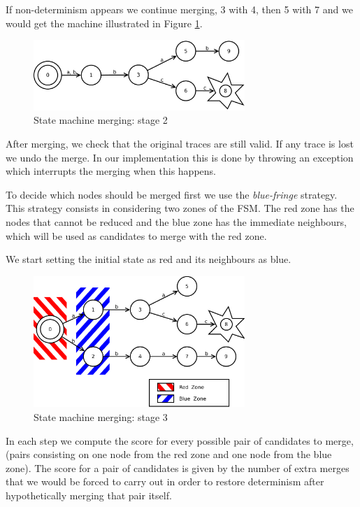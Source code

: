 \documentclass[]{sigplanconf}
\begin{document}
If non-determinism appears we continue merging, 3 with 4, then
5 with 7 and we would get the machine illustrated in Figure \ref{fsm3}.

\begin{figure}
\begin{center}
\includegraphics[width=8cm]{pictures/fsm3.pdf}
\end{center}
\caption{State machine merging: stage 2}
\label{fsm3}
\end{figure}

After merging, we check that the original traces are still
valid. If any trace is lost we undo the merge. In our implementation
this is done by throwing an exception which interrupts the merging
when this happens.

To decide which nodes should be merged first we use the \emph{
blue-fringe} strategy. This strategy consists in considering two zones of the
FSM. The red zone has the nodes that cannot be reduced
and the blue zone has the immediate neighbours, which will
be used as candidates to merge with the red zone.

We start setting the initial state as red and its neighbours as blue.

\begin{figure}
\begin{center}
\includegraphics[width=8cm]{pictures/fsm4.pdf}
\end{center}
\caption{State machine merging: stage 3}
\label{fsm4}
\end{figure}

In each step we compute the score for every possible pair of candidates
to merge, (pairs consisting on one node from the red zone and one node from the blue zone).
The score for a pair of candidates is given by the number of extra
merges that we would be forced to carry out in order to restore determinism after
hypothetically merging that pair itself.
\end{document}
